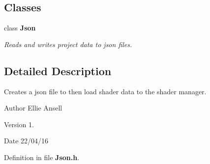 \subsection*{Classes}
\begin{DoxyCompactItemize}
\item 
class {\bf Json}
\begin{DoxyCompactList}\small\item\em Reads and writes project data to json files. \end{DoxyCompactList}\end{DoxyCompactItemize}


\subsection{Detailed Description}
Creates a json file to then load shader data to the shader manager. \begin{DoxyAuthor}{Author}
Ellie Ansell 
\end{DoxyAuthor}
\begin{DoxyVersion}{Version}
1. 
\end{DoxyVersion}
\begin{DoxyDate}{Date}
22/04/16 
\end{DoxyDate}


Definition in file {\bf Json.\-h}.

